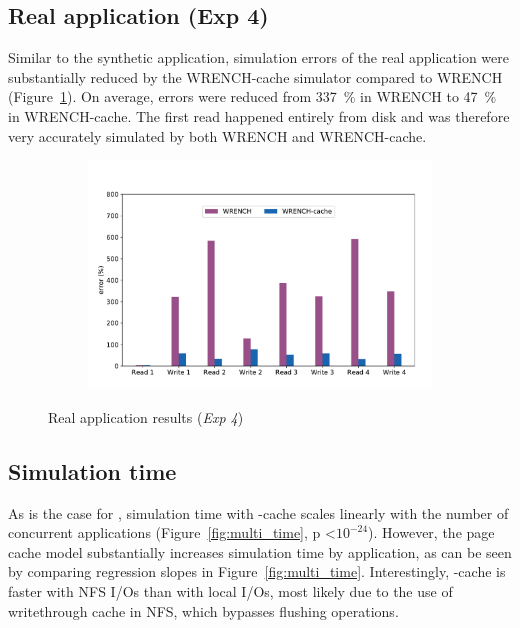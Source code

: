 \FloatBarrier

\subsection{Real application (Exp 4)}
Similar to the synthetic application, simulation errors of the real 
application were substantially reduced by the WRENCH-cache simulator 
compared to WRENCH (Figure~\ref{fig:nighres}). 
On average, errors were reduced from 337~\% in WRENCH to 47~\% in 
WRENCH-cache. 
The first read happened entirely from disk and was therefore 
very accurately simulated by both WRENCH and WRENCH-cache.

\begin{figure}[!ht]
    \begin{subfigure}{0.95\linewidth}
        \centering
        \includegraphics[width=\linewidth]{result/nighres/figures/nighres_errors.pdf}
    \end{subfigure}
    \caption{Real application results (\textit{Exp 4})}
    \label{fig:nighres}
\end{figure}

\FloatBarrier

\subsection{Simulation time}

As is the case for \wrench, simulation time with \wrench-cache scales
linearly with the number of concurrent applications
(Figure~\ref{fig:multi_time}, p \textless $10^{-24}$). However, the page
cache model substantially increases simulation time by
application, as can be seen by comparing regression slopes in
Figure~\ref{fig:multi_time}. Interestingly, \wrench-cache is faster with 
NFS I/Os than with local I/Os, most likely due to the use of writethrough
cache in NFS, which bypasses flushing operations.

